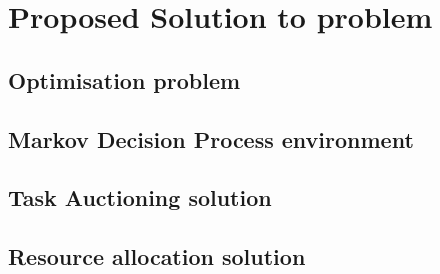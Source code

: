 \chapter{Proposed Solution to problem}\label{ch:proposed-solution-to-problem}
\section{Optimisation problem}\label{sec:optimisation-problem}

\section{Markov Decision Process environment}\label{sec:markov-decision-process-description}

\section{Task Auctioning solution}\label{sec:task-auctioning}

\section{Resource allocation solution}\label{sec:resource-allocation-solution}